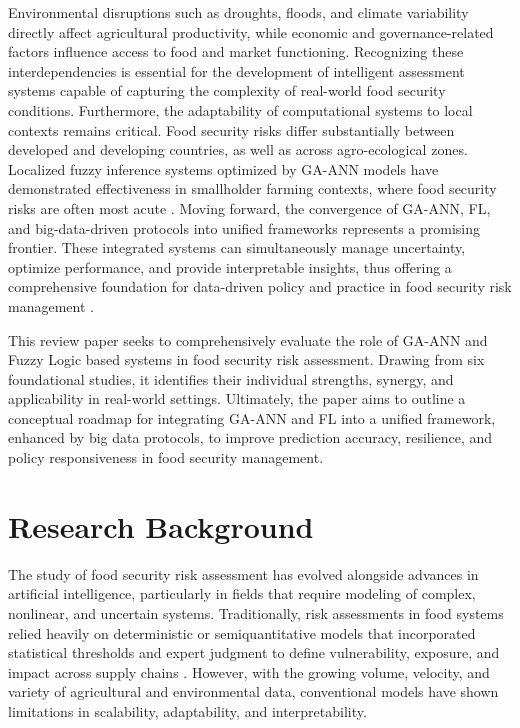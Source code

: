 \documentclass[preprint,12pt]{elsarticle}
\begin{document}
	Environmental disruptions such as droughts, floods, and climate
	variability directly affect agricultural productivity, while economic
	and governance-related factors influence access to food and market
	functioning. Recognizing these interdependencies is essential for the
	development of intelligent assessment systems capable of capturing the
	complexity of real-world food security conditions. Furthermore, the
	adaptability of computational systems to local contexts remains
	critical. Food security risks differ substantially between developed and
	developing countries, as well as across agro-ecological zones. Localized
	fuzzy inference systems optimized by GA-ANN models have demonstrated
	effectiveness in smallholder farming contexts, where food security risks
	are often most acute \cite{ref102}. Moving forward, the convergence of GA-ANN,
	FL, and big-data-driven protocols into unified frameworks represents a
	promising frontier. These integrated systems can simultaneously manage
	uncertainty, optimize performance, and provide interpretable insights,
	thus offering a comprehensive foundation for data-driven policy and
	practice in food security risk management \cite{ref10}.
	
	This review paper seeks to comprehensively evaluate the role of GA-ANN
	and Fuzzy Logic based systems in food security risk assessment. Drawing
	from six foundational studies, it identifies their individual strengths,
	synergy, and applicability in real-world settings. Ultimately, the paper
	aims to outline a conceptual roadmap for integrating GA-ANN and FL into
	a unified framework, enhanced by big data protocols, to improve
	prediction accuracy, resilience, and policy responsiveness in food
	security management.
	
	\section{Research Background}
	
	The study of food security risk assessment has evolved alongside
	advances in artificial intelligence, particularly in fields that require
	modeling of complex, nonlinear, and uncertain systems. Traditionally,
	risk assessments in food systems relied heavily on deterministic or
	semiquantitative models that incorporated statistical thresholds and
	expert judgment to define vulnerability, exposure, and impact across
	supply chains \cite{ref8}. However, with the growing volume, velocity, and
	variety of agricultural and environmental data, conventional models have
	shown limitations in scalability, adaptability, and interpretability.
	
\end{document}
